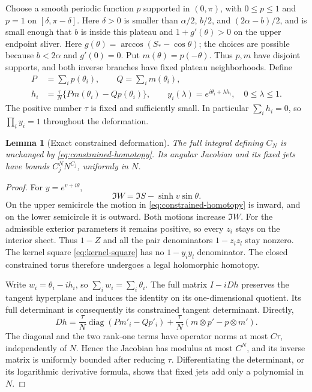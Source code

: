 \documentclass[11pt]{article}
\numberwithin{equation}{section}
\newtheorem{lemma}[theorem]{Lemma}
\theoremstyle{remark}\newtheorem{remark}[theorem]{Remark}
\begin{document}
Choose a smooth periodic function $p$ supported in $(0,\pi)$,
with $0\le p\le1$ and $p=1$ on $[\delta,\pi-\delta]$.
Here $\delta>0$ is smaller than $\alpha/2$, $b/2$, and
$(2\alpha-b)/2$, and is small enough that $b$ is inside this
plateau and $1+g'(\theta)>0$ on the upper endpoint sliver.
Here $g(\theta)=\arccos(S_*-\cos\theta)$; the choices are
possible because $b<2\alpha$ and $g'(0)=0$.  Put $m(\theta)=p(-\theta)$.  Thus $p,m$ have
disjoint supports, and both inverse branches have fixed plateau
neighborhoods.  Define
\begin{equation}\label{eq:constrained-homotopy}
 \begin{aligned}
 P&=\sum_i p(\theta_i),\qquad Q=\sum_i m(\theta_i),\\
 h_i&=\frac\tau N\{P m(\theta_i)-Q p(\theta_i)\},\qquad
 y_i(\lambda)=e^{i\theta_i+\lambda h_i},\quad 0\le\lambda\le1.
 \end{aligned}
\end{equation}
The positive number $\tau$ is fixed and sufficiently small.  In
particular $\sum_i h_i=0$, so $\prod_i y_i=1$ throughout the
deformation.

\begin{lemma}[Exact constrained deformation]
\label{lem:constrained-homotopy}
The full integral defining $C_N$ is unchanged by
\eqref{eq:constrained-homotopy}.  Its angular Jacobian and its fixed
jets have bounds $C_j^N N^{C_j}$, uniformly in $N$.
\end{lemma}
\begin{proof}
For $y=e^{v+i\theta}$,
\[
 \Im W=\Im S-\sinh v\sin\theta.
\]
On the upper semicircle the motion in
\eqref{eq:constrained-homotopy} is inward, and on the lower
semicircle it is outward.  Both motions increase $\Im W$.
For the admissible exterior parameters it remains positive, so every
$z_i$ stays on the interior sheet.  Thus $1-Z$ and all the pair
denominators $1-z_i z_l$ stay nonzero.  The kernel square \eqref{eq:kernel-square} has no
$1-y_i y_l$ denominator.  The closed constrained torus therefore
undergoes a legal holomorphic homotopy.

Write $w_i=\theta_i-i h_i$, so $\sum_iw_i=\sum_i\theta_i$.
The full matrix $I-iDh$ preserves the tangent hyperplane and induces
the identity on its one-dimensional quotient.  Its full determinant
is consequently its constrained tangent determinant.  Directly,
\[
 Dh=\frac\tau N\operatorname{diag}(P m'_i-Qp'_i)
       +\frac\tau N(m\otimes p'-p\otimes m').
\]
The diagonal and the two rank-one terms have operator norms at most
$C\tau$, independently of $N$.  Hence the Jacobian has modulus at
most $C^N$, and its inverse matrix is uniformly bounded after reducing
$\tau$.  Differentiating the determinant, or its logarithmic derivative
formula, shows that fixed jets add only a polynomial in $N$.
\end{proof}
\end{document}
